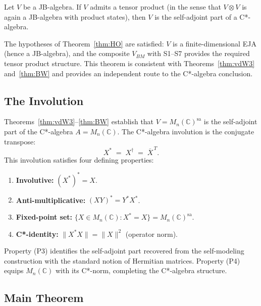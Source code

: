 \begin{theorem}\label{thm:HO}
Let $V$ be a JB-algebra. If $V$ admits a tensor product (in the sense
that $V\otimes V$ is again a JB-algebra with product states), then $V$ is
the self-adjoint part of a C*-algebra.
\end{theorem}

\noindent
The hypotheses of Theorem~\ref{thm:HO} are satisfied: $V$ is a
finite-dimensional EJA (hence a JB-algebra), and the composite $V_{BM}$
with S1--S7 provides the required tensor product structure. This theorem
is consistent with Theorems~\ref{thm:vdW3} and~\ref{thm:BW} and
provides an independent route to the C*-algebra conclusion.

\subsection{The Involution}\label{subsec:involution}

Theorems~\ref{thm:vdW3}--\ref{thm:BW} establish that
$V = M_n(\mathbb{C})^{\mathrm{sa}}$ is the self-adjoint part of the
C*-algebra $A = M_n(\mathbb{C})$. The C*-algebra involution is the
conjugate transpose:
\[
  X^* \;=\; X^\dagger \;=\; \overline{X}^{\,T}.
\]
This involution satisfies four defining properties:
\begin{enumerate}
\item[\emph{(P1)}] \textbf{Involutive:} $(X^*)^* = X$.
\item[\emph{(P2)}] \textbf{Anti-multiplicative:} $(XY)^* = Y^*X^*$.
\item[\emph{(P3)}] \textbf{Fixed-point set:}
  $\{X \in M_n(\mathbb{C}) : X^* = X\}
  = M_n(\mathbb{C})^{\mathrm{sa}}$.
\item[\emph{(P4)}] \textbf{C*-identity:}
  $\|X^*X\| = \|X\|^2$ (operator norm).
\end{enumerate}
Property (P3) identifies the self-adjoint part recovered from the
self-modeling construction with the standard notion of Hermitian matrices.
Property (P4) equips $M_n(\mathbb{C})$ with its C*-norm, completing the
C*-algebra structure.

\subsection{Main Theorem}\label{subsec:main-theorem}

